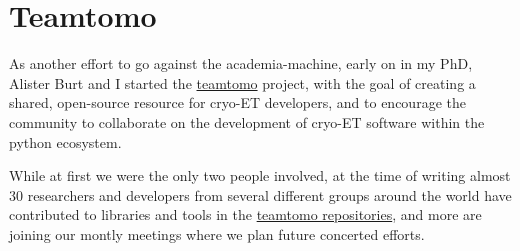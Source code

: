 \section{Teamtomo}\label{teamtomo}

As another effort to go against the academia-machine, early on in my PhD, Alister Burt and I started the \href{https://teamtomo.org}{teamtomo} project, with the goal of creating a shared, open-source resource for cryo-ET developers, and to encourage the community to collaborate on the development of cryo-ET software within the python ecosystem.

While at first we were the only two people involved, at the time of writing almost 30 researchers and developers from several different groups around the world have contributed to libraries and tools in the \href{https://github.com/teamtomo}{teamtomo repositories}, and more are joining our montly meetings where we plan future concerted efforts.



